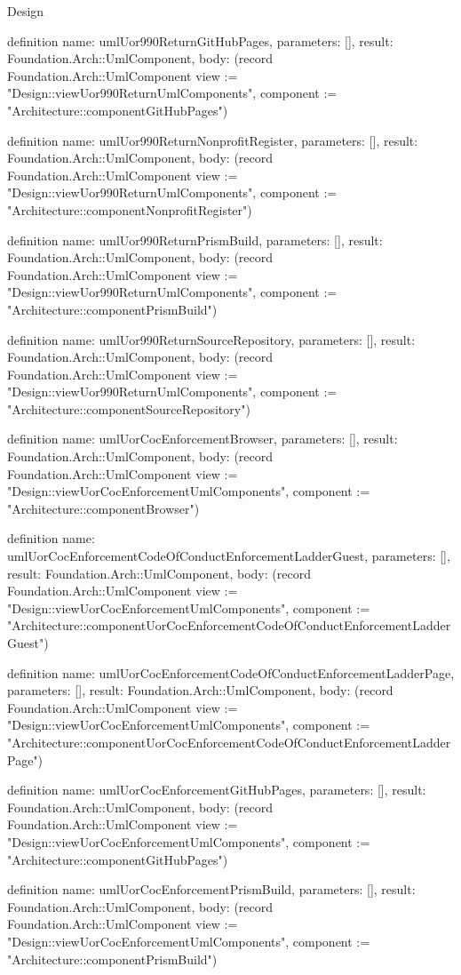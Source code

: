 \begin{lexlean}{Design}
\begin{semanticmodule}
definition{
  name: umlUor990ReturnGitHubPages,
  parameters: [],
  result: Foundation.Arch::UmlComponent,
  body: (record Foundation.Arch::UmlComponent {view := "Design::viewUor990ReturnUmlComponents", component := "Architecture::componentGitHubPages"})
}

definition{
  name: umlUor990ReturnNonprofitRegister,
  parameters: [],
  result: Foundation.Arch::UmlComponent,
  body: (record Foundation.Arch::UmlComponent {view := "Design::viewUor990ReturnUmlComponents", component := "Architecture::componentNonprofitRegister"})
}

definition{
  name: umlUor990ReturnPrismBuild,
  parameters: [],
  result: Foundation.Arch::UmlComponent,
  body: (record Foundation.Arch::UmlComponent {view := "Design::viewUor990ReturnUmlComponents", component := "Architecture::componentPrismBuild"})
}

definition{
  name: umlUor990ReturnSourceRepository,
  parameters: [],
  result: Foundation.Arch::UmlComponent,
  body: (record Foundation.Arch::UmlComponent {view := "Design::viewUor990ReturnUmlComponents", component := "Architecture::componentSourceRepository"})
}

definition{
  name: umlUorCocEnforcementBrowser,
  parameters: [],
  result: Foundation.Arch::UmlComponent,
  body: (record Foundation.Arch::UmlComponent {view := "Design::viewUorCocEnforcementUmlComponents", component := "Architecture::componentBrowser"})
}

definition{
  name: umlUorCocEnforcementCodeOfConductEnforcementLadderGuest,
  parameters: [],
  result: Foundation.Arch::UmlComponent,
  body: (record Foundation.Arch::UmlComponent {view := "Design::viewUorCocEnforcementUmlComponents", component := "Architecture::componentUorCocEnforcementCodeOfConductEnforcementLadderGuest"})
}

definition{
  name: umlUorCocEnforcementCodeOfConductEnforcementLadderPage,
  parameters: [],
  result: Foundation.Arch::UmlComponent,
  body: (record Foundation.Arch::UmlComponent {view := "Design::viewUorCocEnforcementUmlComponents", component := "Architecture::componentUorCocEnforcementCodeOfConductEnforcementLadderPage"})
}

definition{
  name: umlUorCocEnforcementGitHubPages,
  parameters: [],
  result: Foundation.Arch::UmlComponent,
  body: (record Foundation.Arch::UmlComponent {view := "Design::viewUorCocEnforcementUmlComponents", component := "Architecture::componentGitHubPages"})
}

definition{
  name: umlUorCocEnforcementPrismBuild,
  parameters: [],
  result: Foundation.Arch::UmlComponent,
  body: (record Foundation.Arch::UmlComponent {view := "Design::viewUorCocEnforcementUmlComponents", component := "Architecture::componentPrismBuild"})
}


\end{semanticmodule}
\end{lexlean}
